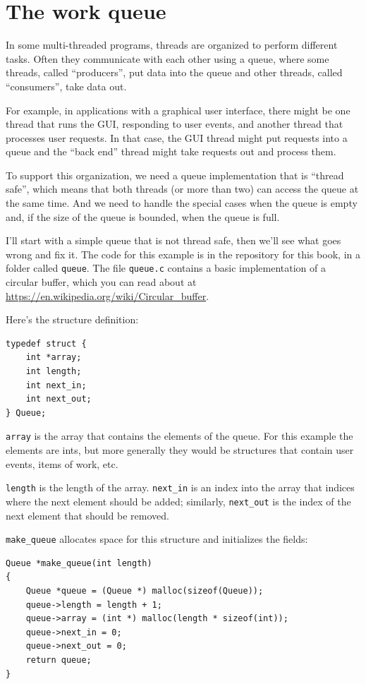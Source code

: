 \documentclass[12pt]{book}
\begin{document}
{\section{The work queue}
\label{queue}

In some multi-threaded programs, threads are organized to perform
different tasks.  Often they communicate with each other using a queue,
where some threads, called ``producers'', put data into the queue
and other threads, called ``consumers'', take data out.

For example, in applications with a graphical user interface, there
might be one thread that runs the GUI, responding to user events,
and another thread that processes user requests.  In that case,
the GUI thread might put requests into a queue and the ``back end''
thread might take requests out and process them.

To support this organization, we need a queue implementation that is
``thread safe'', which means that both threads (or more than two) can
access the queue at the same time.  And we need to handle the special
cases when the queue is empty and, if the size of the queue is
bounded, when the queue is full.

I'll start with a simple queue that is not thread safe, then we'll see
what goes wrong and fix it.  The code for this example is in the
repository for this book, in a folder called {\tt queue}.  The file
{\tt queue.c} contains a basic implementation of a circular buffer,
which you can read about at
\url{https://en.wikipedia.org/wiki/Circular_buffer}.

Here's the structure definition:

\begin{verbatim}
typedef struct {
    int *array;
    int length;
    int next_in;
    int next_out;
} Queue;
\end{verbatim}

{\tt array} is the array that contains the elements of the queue.
For this example the elements are ints, but more generally
they would be structures that contain user events, items of work, etc.

{\tt length} is the length of the array.  \verb"next_in" is an
index into the array that indices where the next element should be
added; similarly, \verb"next_out" is the index of the next element
that should be removed.

\verb"make_queue" allocates space for this structure and initializes
the fields:

\begin{verbatim}
Queue *make_queue(int length)
{
    Queue *queue = (Queue *) malloc(sizeof(Queue));
    queue->length = length + 1;
    queue->array = (int *) malloc(length * sizeof(int));
    queue->next_in = 0;
    queue->next_out = 0;
    return queue;
}
\end{verbatim}

}
\end{document}
